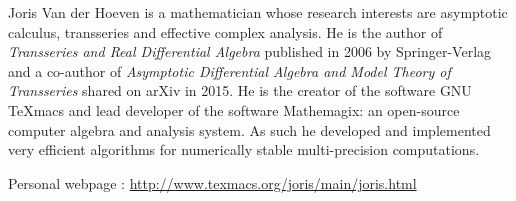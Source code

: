 \documentclass[12pt]{paper}
\begin{document}
Joris Van der Hoeven is a mathematician whose research interests are
asymptotic calculus, transseries and effective complex analysis. 
He is the author of \textit{Transseries and Real Differential Algebra}
published in 2006 by Springer-Verlag and a co-author of \textit{Asymptotic
 Differential Algebra and Model Theory of Transseries} shared on arXiv in 2015.
He is the creator of the software GNU TeXmacs and lead developer
of the software Mathemagix: an open-source computer algebra and analysis system. 
As such he developed and implemented very efficient algorithms for numerically stable 
multi-precision computations.

Personal webpage : \url{http://www.texmacs.org/joris/main/joris.html}
\end{document}

